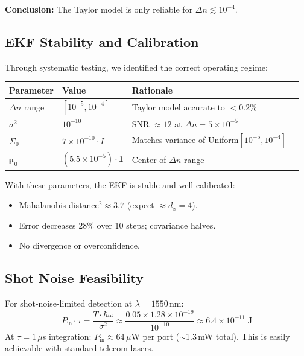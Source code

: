 \documentclass[11pt,a4paper]{article}
\begin{document}
\textbf{Conclusion:} The Taylor model is only reliable for $\Delta n \lesssim 10^{-4}$.

\subsection{EKF Stability and Calibration}

Through systematic testing, we identified the correct operating regime:

\begin{center}
\begin{tabular}{@{}llll@{}}
\toprule
Parameter & Value & Rationale \\
\midrule
$\Delta n$ range & $[10^{-5}, 10^{-4}]$ & Taylor model accurate to $<0.2\%$ \\
$\sigma^2$ & $10^{-10}$ & SNR $\approx 12$ at $\Delta n = 5 \times 10^{-5}$ \\
$\Sigma_0$ & $7 \times 10^{-10} \cdot I$ & Matches variance of Uniform$[10^{-5}, 10^{-4}]$ \\
$\bm{\mu}_0$ & $(5.5 \times 10^{-5}) \cdot \bm{1}$ & Center of $\Delta n$ range \\
\bottomrule
\end{tabular}
\end{center}

With these parameters, the EKF is stable and well-calibrated:
\begin{itemize}[nosep]
  \item Mahalanobis distance$^2 \approx 3.7$ (expect $\approx d_x = 4$).
  \item Error decreases 28\% over 10 steps; covariance halves.
  \item No divergence or overconfidence.
\end{itemize}

\subsection{Shot Noise Feasibility}

For shot-noise-limited detection at $\lambda = 1550$\,nm:
\[
  P_{\text{in}} \cdot \tau = \frac{T \cdot \hbar\omega}{\sigma^2} \approx \frac{0.05 \times 1.28 \times 10^{-19}}{10^{-10}} \approx 6.4 \times 10^{-11}\;\text{J}
\]
At $\tau = 1\,\mu$s integration: $P_{\text{in}} \approx 64\,\mu$W per port ($\sim$1.3\,mW total).  This is easily achievable with standard telecom lasers.

\end{document}
